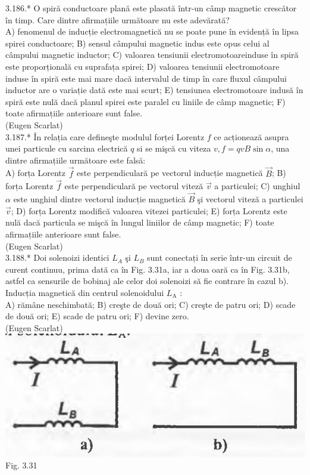 \documentclass[10pt]{article}
\begin{document}
3.186.* O spiră conductoare plană este plasată într-un câmp magnetic crescător în timp. Care dintre afirmațiile următoare nu este adevărată?\\ A) fenomenul de inducție electromagnetică nu se poate pune în evidență în lipsa spirei conductoare; B) sensul câmpului magnetic indus este opus celui al câmpului magnetic inductor; C) valoarea tensiunii electromotoareinduse în spiră este proporțională cu suprafața spirei; D) valoarea tensiunii electromotoare induse în spiră este mai mare dacă intervalul de timp în care fluxul câmpului inductor are o variație dată este mai scurt; E) tensiunea electromotoare indusă în spiră este nulă dacă planul spirei este paralel cu liniile de câmp magnetic; F) toate afirmațiile anterioare sunt false.\\ (Eugen Scarlat)\\

3.187.* În relația care defineşte modulul forței Lorentz $f$ ce acționează asupra unei particule cu sarcina electrică $q$ si se mişcă cu viteza $v, f=q v B \sin \alpha$, una dintre afirmațiile următoare este falsă:\\ A) forța Lorentz $\vec{f}$ este perpendiculară pe vectorul inducție magnetică $\vec{B}$; B) forța Lorentz $\vec{f}$ este perpendiculară pe vectorul viteză $\vec{v}$ a particulei; C) unghiul $\alpha$ este unghiul dintre vectorul inducție magnetică $\vec{B}$ şi vectorul viteză a particulei $\vec{v}$; D) forța Lorentz modifică valoarea vitezei particulei; E) forța Lorentz este nulă dacă particula se mişcă în lungul liniilor de câmp magnetic; F) toate afirmațiile anterioare sunt false.\\ (Eugen Scarlat)\\

3.188.* Doi solenoizi identici $L_{A}$ şi $L_{B}$ sunt conectați în serie într-un circuit de curent continuu, prima dată ca în Fig. 3.31a, iar a doua oară ca în Fig. 3.31b, astfel ca sensurile de bobinaj ale celor doi solenoizi să fie contrare în cazul b). Inducția magnetică din centrul solenoidului $L_{\mathrm{A}}$ :\\ A) rămâne neschimbată; B) creşte de două ori; C) creşte de patru ori; D) scade de două ori; E) scade de patru ori; F) devine zero.\\ (Eugen Scarlat)\\ \includegraphics[max width=\textwidth, center]{2025_07_01_5b3ff9fa0d508c8e9f17g-187} Fig. 3.31\\
\end{document}
